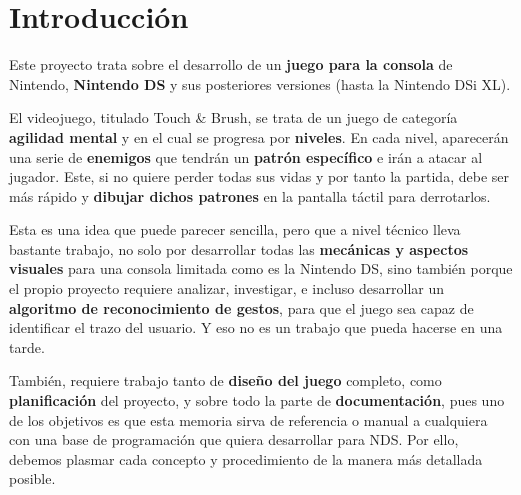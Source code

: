 
\chapter{Introducción}

Este proyecto trata sobre el desarrollo de un \textbf{juego para la consola} de Nintendo, \textbf{Nintendo DS} y sus posteriores versiones (hasta la Nintendo DSi XL).

\vspace{0.5cm}

El videojuego, titulado Touch \& Brush, se trata de un juego de categoría \textbf{agilidad mental} y en el cual se progresa por \textbf{niveles}. En cada nivel, aparecerán una serie de \textbf{enemigos} que tendrán un \textbf{patrón específico} e irán a atacar al jugador. Este, si no quiere perder todas sus vidas y por tanto la partida, debe ser más rápido y \textbf{dibujar dichos patrones} en la pantalla táctil para derrotarlos.

\vspace{0.5cm}

Esta es una idea que puede parecer sencilla, pero que a nivel técnico lleva bastante trabajo, no solo por desarrollar todas las \textbf{mecánicas y aspectos visuales} para una consola limitada como es la Nintendo DS, sino también porque el propio proyecto requiere analizar, investigar, e incluso desarrollar un \textbf{algoritmo de reconocimiento de gestos}, para que el juego sea capaz de identificar el trazo del usuario. Y eso no es un trabajo que pueda hacerse en una tarde.

\vspace{0.5cm}

También, requiere trabajo tanto de \textbf{diseño del juego} completo, como \textbf{planificación} del proyecto, y sobre todo la parte de \textbf{documentación}, pues uno de los objetivos es que esta memoria sirva de referencia o manual a cualquiera con una base de programación que quiera desarrollar para NDS. Por ello, debemos plasmar cada concepto y procedimiento de la manera más detallada posible.

\vspace{0.5cm}

